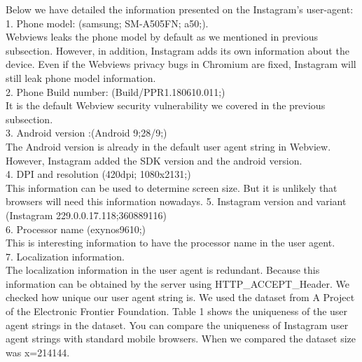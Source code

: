 Below we have detailed the information presented on the Instagram's user-agent:\\
1. Phone model: (samsung; SM-A505FN; a50;).\\
Webviews leaks the phone model by default as we mentioned in previous subsection. However, in addition, Instagram adds its own information about the device. Even if the Webviews privacy bugs in Chromium are fixed, Instagram will still leak phone model information.\\
2.  Phone Build number: (Build/PPR1.180610.011;)\\
It is the default Webview security vulnerability we covered in the previous subsection.\\
3. Android version :(Android 9;28/9;) \\
The Android version is already in the default user agent string in Webview. However, Instagram added the SDK version and the android version.\\
4. DPI and resolution (420dpi; 1080x2131;)\\
This information can be used to determine screen size. But it is unlikely that browsers will need this information nowadays.
5. Instagram version and variant (Instagram 229.0.0.17.118;360889116)\\
6. Processor name (exynos9610;)\\
This is interesting information to have the processor name in the user agent.\\
7. Localization information. \\
The localization information in the user agent is redundant. Because this information can be obtained by the server using HTTP\_ACCEPT\_Header.
We checked how unique our user agent string is. We used the dataset from A Project of the Electronic Frontier Foundation\cite{tracks}. Table 1 shows the uniqueness of the user agent strings in the dataset. You can compare the uniqueness of Instagram user agent strings with standard mobile browsers.
When we compared the dataset size was x=214144.

